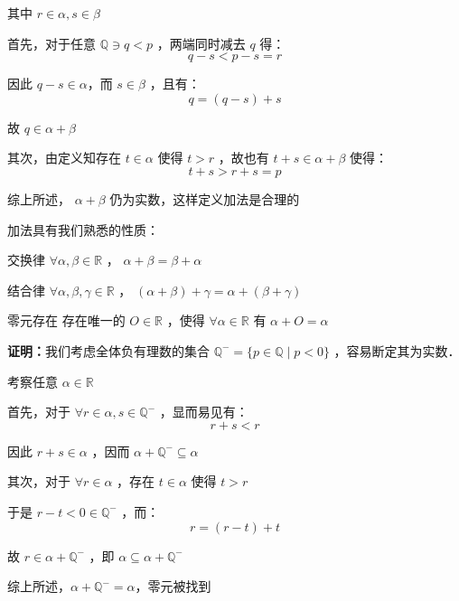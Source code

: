 其中 $r\in\alpha,s\in\beta$

首先，对于任意 $\mathbb{Q}\ni q<p$ ，两端同时减去 $q$ 得：
$$q-s< p-s=r$$

因此 $q-s\in\alpha$，而 $s\in\beta$ ，且有：
$$q=(q-s)+s$$

故 $q\in\alpha+\beta$

其次，由定义知存在 $t\in\alpha$ 使得 $t>r$ ，故也有 $t+s\in\alpha+\beta$ 使得：
$$t+s>r+s=p$$

综上所述， $\alpha+\beta$ 仍为实数，这样定义加法是合理的

加法具有我们熟悉的性质：
 \begin{theorem}{交换律}
 $\forall\alpha,\beta\in\mathbb{R}$ ， $\alpha+\beta=\beta+\alpha$ 
 \end{theorem}
\begin{theorem}{结合律}
$\forall \alpha,\beta,\gamma\in\mathbb{R}$ ， $(\alpha+\beta)+\gamma=\alpha+(\beta+\gamma)$
\end{theorem} 
\begin{theorem}{零元存在}
存在唯一的 $O\in\mathbb{R}$ ，使得 $\forall \alpha\in\mathbb{R}$ 有 $\alpha+O=\alpha$

\textbf{证明：}我们考虑全体负有理数的集合 $\mathbb{Q}^-=\{p\in\mathbb{Q}\mid p<0\}$ ，容易断定其为实数．

考察任意 $\alpha\in\mathbb{R}$

首先，对于 $\forall r\in\alpha,s\in\mathbb{Q}^-$ ，显而易见有：
$$r+s< r$$

因此 $r+s\in\alpha$ ，因而 $\alpha+\mathbb{Q}^-\subseteq\alpha$

其次，对于 $\forall r\in\alpha$ ，存在 $t\in\alpha$ 使得 $t>r$

于是 $r-t<0\in\mathbb{Q}^-$ ，而：
$$r=(r-t)+t$$

故 $r\in\alpha+\mathbb{Q}^-$ ，即 $\alpha\subseteq\alpha+\mathbb{Q}^-$

综上所述，$\alpha+\mathbb{Q}^-=\alpha$，零元被找到
\end{theorem}
